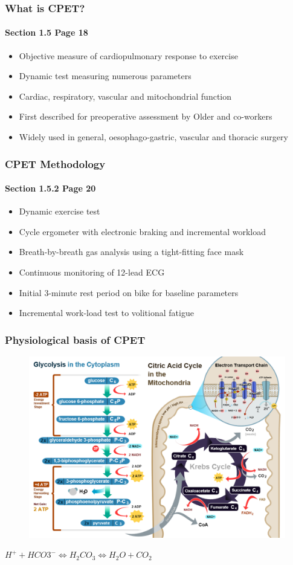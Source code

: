 \documentclass{beamer}
\begin{document}
\begin{frame}
	\frametitle{What is CPET?}
	\framesubtitle{Section 1.5 Page 18}
	\begin{itemize}
		\item Objective measure of cardiopulmonary response to exercise
		\item Dynamic test measuring numerous parameters
		\item Cardiac, respiratory, vascular and mitochondrial function
		\item First described for preoperative assessment by Older and co-workers
		\item Widely used in general, oesophago-gastric, vascular and thoracic surgery
	\end{itemize}
\end{frame}

\begin{frame}
	\frametitle{CPET Methodology}
	\framesubtitle{Section 1.5.2 Page 20 }
	\begin{itemize}
		\item Dynamic exercise test
		\item Cycle ergometer with electronic braking and incremental workload
		\item Breath-by-breath gas analysis using a tight-fitting face mask
		\item Continuous monitoring of 12-lead ECG
		\item Initial 3-minute rest period on bike for baseline parameters
		\item Incremental work-load test to volitional fatigue
	\end{itemize}
\end{frame}

\begin{frame}
	\frametitle{Physiological basis of CPET} 
	\begin{figure}
		\centering
		\includegraphics[width=0.5\linewidth]{CellRespiration}
		\label{fig:CellRespiration}
	\end{figure}
	\begin{block}
	\centering
	$H^+ + HCO3^- \Longleftrightarrow H_2CO_3 \Longleftrightarrow H_2O + CO_2$
	\end{block}

\end{frame}
\end{document}
